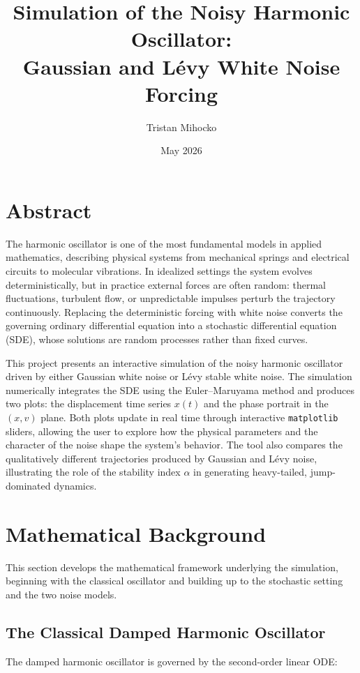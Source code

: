 \documentclass[12pt]{article}
\title{\vspace{-3cm}Simulation of the Noisy Harmonic Oscillator:\\
Gaussian and L\'{e}vy White Noise Forcing}
\author{Tristan Mihocko}
\date{May 2026}
\begin{document}
\maketitle

\section*{Abstract}
The harmonic oscillator is one of the most fundamental models in applied
mathematics, describing physical systems from mechanical springs and electrical
circuits to molecular vibrations. In idealized settings the system evolves
deterministically, but in practice external forces are often random: thermal
fluctuations, turbulent flow, or unpredictable impulses perturb the trajectory
continuously. Replacing the deterministic forcing with white noise converts
the governing ordinary differential equation into a stochastic differential
equation (SDE), whose solutions are random processes rather than fixed curves.

This project presents an interactive simulation of the noisy harmonic oscillator
driven by either Gaussian white noise or L\'{e}vy stable white noise. The
simulation numerically integrates the SDE using the Euler--Maruyama method and
produces two plots: the displacement time series $x(t)$ and the phase portrait
in the $(x, v)$ plane. Both plots update in real time through interactive
\texttt{matplotlib} sliders, allowing the user to explore how the physical
parameters and the character of the noise shape the system's behavior. The
tool also compares the qualitatively different trajectories produced by Gaussian
and L\'{e}vy noise, illustrating the role of the stability index $\alpha$ in
generating heavy-tailed, jump-dominated dynamics.

\section{Mathematical Background}

This section develops the mathematical framework underlying the simulation,
beginning with the classical oscillator and building up to the stochastic
setting and the two noise models.

\subsection{The Classical Damped Harmonic Oscillator}

The damped harmonic oscillator is governed by the second-order linear ODE:
\end{document}
